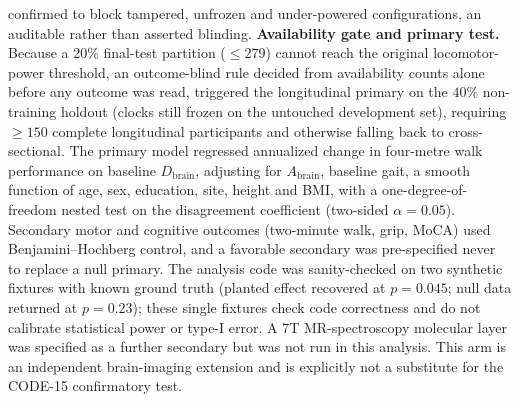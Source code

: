 \documentclass[11pt]{article}
\newcommand{\D}{\ensuremath{D}}
\newcommand{\A}{\ensuremath{A}}
\begin{document}
confirmed to block tampered, unfrozen and under-powered configurations, an auditable
rather than asserted blinding. \textbf{Availability gate and primary test.} Because a
$20\%$ final-test partition ($\le\num{279}$) cannot reach the original locomotor-power
threshold, an outcome-blind rule decided from availability counts alone before any
outcome was read, triggered the longitudinal primary on the $40\%$ non-training holdout
(clocks still frozen on the untouched development set), requiring $\ge\num{150}$ complete
longitudinal participants and otherwise falling back to cross-sectional. The primary model
regressed annualized change in four-metre walk performance on baseline $\D_{\text{brain}}$,
adjusting for $\A_{\text{brain}}$, baseline gait, a smooth function of age, sex, education,
site, height and BMI, with a one-degree-of-freedom nested test on the disagreement
coefficient (two-sided $\alpha=\num{0.05}$). Secondary motor and cognitive outcomes
(two-minute walk, grip, MoCA) used Benjamini--Hochberg control, and a favorable secondary
was pre-specified never to replace a null primary. The analysis code was sanity-checked on
two synthetic fixtures with known ground truth (planted effect recovered at $p=\num{0.045}$;
null data returned at $p=\num{0.23}$); these single fixtures check code correctness and do
not calibrate statistical power or type-I error. A 7T MR-spectroscopy molecular layer was specified
as a further secondary but was not run in this analysis. This arm is an independent
brain-imaging extension and is explicitly not a substitute for the CODE-15 confirmatory
test.
\end{document}
